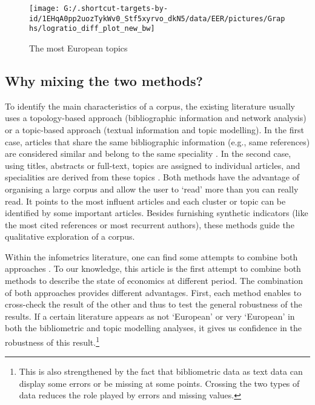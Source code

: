\documentclass[]{elsarticle} %
\begin{document}
\begin{figure}[h]

{\centering \texttt{[image: G:/.shortcut-targets-by-id/1EHqA0pp2uozTykWv0\_Stf5xyrvo\_dkN5/data/EER/pictures/Graphs/logratio\_diff\_plot\_new\_bw]} 

}

\caption{The most European topics}\label{fig:plot-topic-diff}
\end{figure}

\hypertarget{why-mixing-the-two-methods}{%
\subsection{Why mixing the two
methods?}\label{why-mixing-the-two-methods}}

To identify the main characteristics of a corpus, the existing
literature usually uses a topology-based approach (bibliographic
information and network analysis) or a topic-based approach (textual
information and topic modelling). In the first case, articles that share
the same bibliographic information (e.g., same references) are
considered similar and belong to the same speciality
\citep{claveau2016}. In the second case, using titles, abstracts or
full-text, topics are assigned to individual articles, and specialities
are derived from these topics \citep{ambrosino2018}. Both methods have
the advantage of organising a large corpus and allow the user to `read'
more than you can really read. It points to the most influent articles
and each cluster or topic can be identified by some important articles.
Besides furnishing synthetic indicators (like the most cited references
or most recurrent authors), these methods guide the qualitative
exploration of a corpus.

Within the infometrics literature, one can find some attempts to combine
both approaches
\citep{dingCommunity2011, liAdding2012, yanTopics2012, maoTopic2017}. To
our knowledge, this article is the first attempt to combine both methods
to describe the state of economics at different period. The combination
of both approaches provides different advantages. First, each method
enables to cross-check the result of the other and thus to test the
general robustness of the results. If a certain literature appears as
not `European' or very `European' in both the bibliometric and topic
modelling analyses, it gives us confidence in the robustness of this
result.\footnote{This is also strengthened by the fact that bibliometric
  data as text data can display some errors or be missing at some
  points. Crossing the two types of data reduces the role played by
  errors and missing values.}
\end{document}
